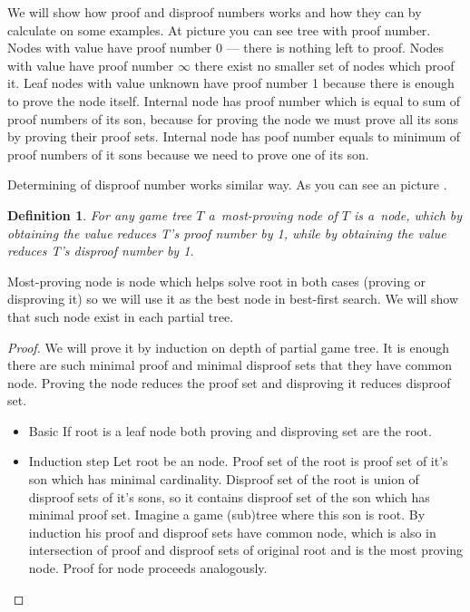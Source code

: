 We will show how proof and disproof numbers works and how they can by calculate
on some examples. At picture  you can see tree with proof number.
Nodes with value \value{true} have proof number 0 --- there is nothing left to
proof. Nodes with value \value{false} have proof number $ \infty $ there
exist no smaller set of nodes which proof it. Leaf nodes with value \value
{unknown} have proof number 1 because there is enough to prove the node itself.
Internal  node has proof number which is equal to sum of proof numbers
of its son, because for proving the  node we must prove all its sons
by proving their proof sets. Internal  node has poof number equals to
minimum of proof numbers of it sons because we need to prove one of its son.

Determining of disproof number works similar way. As you can see an picture
. 

\newtheorem*{mostProvingNode}{Definition}	
\begin{mostProvingNode}
	For any game tree $T$ a~{\sl most-proving node} of $T$ is a~node, which by 
	obtaining the value \value{true} reduces T's proof number by 1, while by obtaining the
	value \value{false}  reduces T's disproof number by 1.
\end{mostProvingNode}

Most-proving node is node which helps solve root in both cases (proving or disproving it)
so we will use 
it as the best node in best-first search. We will show that such node exist in each
partial tree.

\begin{proof}

	We will prove it by induction on depth of partial game tree.
	It is enough there are such minimal proof and minimal disproof sets that they have 
	common node. Proving the node reduces the proof set and disproving it reduces
	disproof set.

	\begin{itemize} 
		\item{Basic} 
			If root is a leaf node both proving and disproving set 
			are the root.
		\item{Induction step}
			Let root be an  node. Proof set of the root is proof set
			of it's son which has minimal cardinality. Disproof set of the root
			is union of disproof sets of it's sons, so it contains
			disproof set of the son which has minimal proof set.
			Imagine a game (sub)tree where this son is root. By induction his
			proof and disproof sets have common node, which is also 
			in intersection of proof and disproof sets of original root and
			is the most proving node.
			Proof for  node proceeds analogously.
	\end{itemize}
\end{proof}

